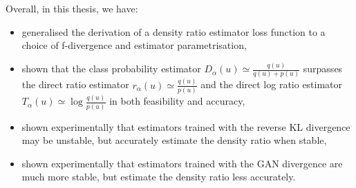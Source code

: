 \documentclass[honours,12pt]{unswthesis}
\numberwithin{equation}{section}
\theoremstyle{definition}
\begin{document}
Overall, in this thesis, we have:
\begin{itemize}
\item generalised the derivation of a density ratio estimator loss function to a choice of f-divergence and estimator parametrisation,
\item shown that the class probability estimator $D_\alpha(u)\simeq \frac{q(u)}{q(u)+p(u)}$ surpasses the direct ratio estimator $r_\alpha(u)\simeq \frac{q(u)}{p(u)}$ and the direct log ratio estimator $T_\alpha(u)\simeq \log \frac{q(u)}{p(u)}$ in both feasibility and accuracy,
\item shown experimentally that estimators trained with the reverse KL divergence may be unstable, but accurately estimate the density ratio when stable,
\item shown experimentally that estimators trained with the GAN divergence are much more stable, but estimate the density ratio less accurately.
\end{itemize}
\end{document}
